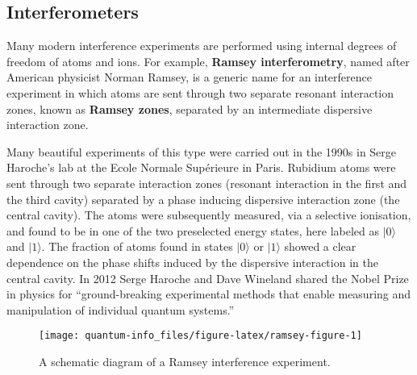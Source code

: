 \documentclass{article}
\begin{document}
\hypertarget{interferometers}{%
\subsection{Interferometers}\label{interferometers}}

Many modern interference experiments are performed using internal degrees of freedom of atoms and ions. For example, \textbf{Ramsey interferometry}, named after American physicist Norman Ramsey, is a generic name for an interference experiment in which atoms are sent through two separate resonant interaction zones, known as \textbf{Ramsey zones}, separated by an intermediate dispersive interaction zone.

Many beautiful experiments of this type were carried out in the 1990s in Serge Haroche's lab at the Ecole Normale Supérieure in Paris. Rubidium atoms were sent through two separate interaction zones (resonant interaction in the first and the third cavity) separated by a phase inducing dispersive interaction zone (the central cavity). The atoms were subsequently measured, via a selective ionisation, and found to be in one of the two preselected energy states, here labeled as \(|0\rangle\) and \(|1\rangle\). The fraction of atoms found in states \(|0\rangle\) or \(|1\rangle\) showed a clear dependence on the phase shifts induced by the dispersive interaction in the central cavity. In 2012 Serge Haroche and Dave Wineland shared the Nobel Prize in physics for ``ground-breaking experimental methods that enable measuring and manipulation of individual quantum systems.''



\begin{figure}[H]

{\centering \texttt{[image: quantum-info\_files/figure-latex/ramsey-figure-1]} 

}

\caption{A schematic diagram of a Ramsey interference experiment.}\label{fig:ramsey-figure}
\end{figure}
\end{document}
